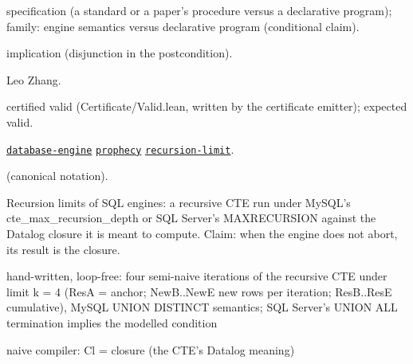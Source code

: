 \documentclass[10pt]{article}
\begin{document}
\begin{description}[leftmargin=2.6cm,style=nextline,itemsep=1pt]

\item[Category] specification (a standard or a paper's procedure versus a declarative program); family: engine semantics versus declarative program (conditional claim).

\item[Kind] implication (disjunction in the postcondition).

\item[Contributors] Leo Zhang.

\item[Status] certified valid (Certificate/Valid.lean, written by the certificate emitter); expected valid.

\item[Tags] \hyperref[tag:database-engine]{\texttt{database-engine}} \hyperref[tag:prophecy]{\texttt{prophecy}} \hyperref[tag:recursion-limit]{\texttt{recursion-limit}}.

\item[Input]  (canonical notation).

\item[Summary] Recursion limits of SQL engines: a recursive CTE run under MySQL's cte\_max\_recursion\_depth or SQL Server's MAXRECURSION against the Datalog closure it is meant to compute. Claim: when the engine does not abort, its result is the closure.

\item[Sides] hand-written, loop-free: four semi-naive iterations of the recursive CTE under limit k = 4 (ResA = anchor; NewB..NewE new rows per iteration; ResB..ResE cumulative), MySQL UNION DISTINCT semantics; SQL Server's UNION ALL termination implies the modelled condition \par naive compiler: Cl = closure (the CTE's Datalog meaning)


\end{description}
\end{document}
